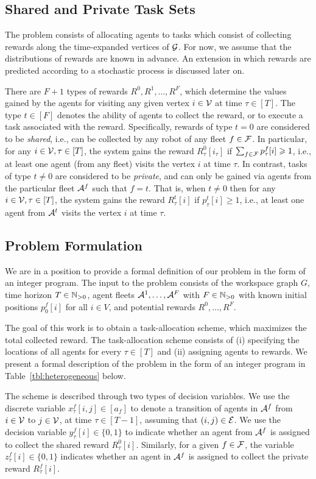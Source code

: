 \documentclass[conference]{IEEEtran}
\begin{document}
\subsection{Shared and Private Task Sets}
The problem consists of allocating agents to tasks which consist of collecting rewards along the time-expanded vertices of $\mathcal{G}$. For now, we assume that the distributions of rewards are known in advance. An extension in which rewards are predicted according to a stochastic process is discussed later on.

There are $F+1$ types of rewards $R^0,R^1,\ldots,R^F$, which determine the values gained by the agents for visiting any given vertex $i\in \mathcal{V}$ at time $\tau\in [T]$.
The type $t\in [F]$ denotes the ability of agents to collect the reward, or to execute a task associated with the reward. Specifically, rewards of type $t=0$ are considered to be \emph{shared}, i.e., can be collected by any robot of any fleet $f\in \mathcal{F}$. In particular, for any $i\in \mathcal{V}, \tau\in [T]$, the system gains the reward $R^0_\tau[i_\tau]$ if $\sum_{f\in \mathcal{F}}p^f_\tau[i]\geqslant 1$, i.e.,  at least one agent (from any fleet) visits the vertex $i$ at time $\tau$.
In contrast, tasks of type $t \neq 0$ are considered to be \emph{private}, and can only be gained via  agents from the particular fleet $\mathcal{A}^f$ such that $f=t$. That is, when $t\neq 0$ then for any $i\in \mathcal{V},\tau\in [T]$, the system gains the reward $R^t_\tau[i]$ if $p^t_\tau[i]\geq 1$, i.e.,  at least one agent from $\mathcal{A}^t$ visits the vertex $i$ at time $\tau$. 


\subsection{Problem Formulation}
We are in a position to provide a formal definition of our problem in the form of an integer program. The input to the problem consists of the workspace graph $G$, time horizon $T\in \mathbb{N}_{>0}$, agent fleets $\mathcal{A}^1,\ldots,\mathcal{A}^F$ with $F\in \mathbb{N}_{>0}$ with known initial positions $p^f_0[i]$ for all $i\in V$, and potential rewards $R^0,\ldots, R^F$. 

The goal of this work is to obtain a task-allocation scheme, which maximizes the total collected reward. The task-allocation scheme consists of (i) specifying the locations of all agents for every $\tau \in [T]$ and (ii) assigning agents to rewards. We present a formal description of the problem in the form of an integer program in Table~\ref{tbl:heterogeneous} below. 

The scheme is described through two types of decision variables. We use the discrete variable $x^f_\tau[i,j]\in [a_f]$ to denote a transition of agents in $\mathcal{A}^f$ from $i\in \mathcal{V}$ to $j\in \mathcal{V}$, at time $\tau\in [T-1]$, assuming that $(i,j)\in \mathcal{E}$.  
We use the decision variable $y^f_\tau[i]\in \{0,1\}$ to indicate whether an agent from $\mathcal{A}^f$ is assigned to collect the shared reward $R^0_\tau[i]$. 
Similarly, for a given $f\in \mathcal{F}$, the variable $z^f_\tau[i]\in \{0,1\}$ indicates whether an agent in $\mathcal{A}^f$  is assigned to collect the private reward $R^f_\tau[i]$. 
\end{document}
